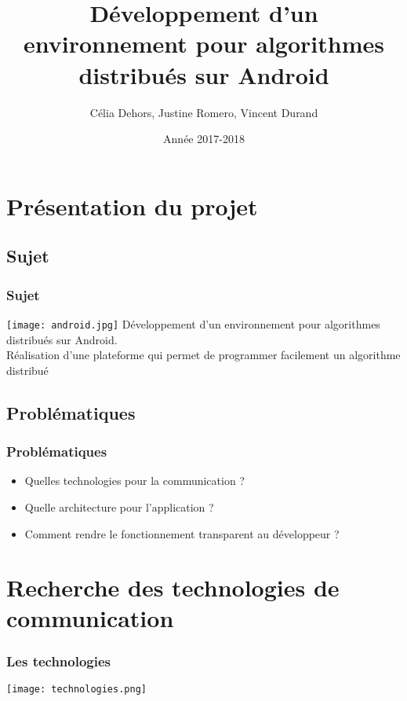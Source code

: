 \documentclass{beamer}
\title{Développement d’un environnement pour algorithmes distribués sur Android}
\author{Célia Dehors, Justine Romero, Vincent Durand}
\institute{Université de Franche-Comté}
\date{Année 2017-2018}
\begin{document}
    \begin{frame}[plain]
        \titlepage
    \end{frame}
    \begin{frame}
        \tableofcontents
    \end{frame}
    \section{Présentation du projet}
      \subsection{Sujet}
	\begin{frame}
	  \frametitle{Sujet}
	  \texttt{[image: android.jpg]}
	  Développement d’un environnement pour algorithmes distribués sur Android.
	  \\Réalisation d’une plateforme qui permet de programmer facilement un algorithme distribué
        \end{frame}
      \subsection{Problématiques}
        \begin{frame}
	  \frametitle{Problématiques}
	  \begin{itemize}
	   \item Quelles technologies pour la communication ?
	   \item Quelle architecture pour l'application ?
	   \item Comment rendre le fonctionnement transparent au développeur ?
	  \end{itemize}

        \end{frame}
    
    \section{Recherche des technologies de communication}
      \begin{frame}
	\frametitle{Les technologies}
	\texttt{[image: technologies.png]}
      \end{frame}
\end{document}
